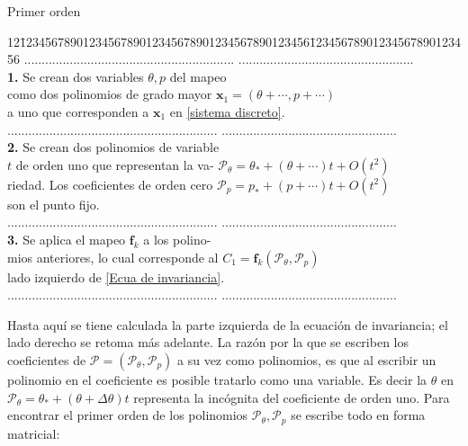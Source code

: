 \begin{center}
Primer orden
\begin{tabbing}
12\=1234567890123456789012345678901234567890123456\=12345678901234567890123456\kill%
\>............................................................  \>..................................................\\
\>\textbf{1.} Se crean dos variables $\theta,p$ del mapeo \> \\
\>como dos polinomios de grado mayor \>$\mathbf{x}_{1}=(\theta+\cdots ,p+\cdots)$  \\
\>a uno que corresponden a $\mathbf{x}_{1}$ en \eqref{sistema discreto}.  \>   \\
\>............................................................  \>..................................................\\
\>\textbf{2.} Se crean dos polinomios de variable\> \\
\>$t$ de orden uno que representan la va-   \> $\mathcal{P}_{\theta}=\theta_{*}+(\theta+\cdots)t+O(t^{2})$\\
\>riedad. Los coeficientes de orden cero \> $ \mathcal{P}_{p}=p_{*}+(p+\cdots)t+O(t^{2})$\\
\>son el punto fijo. \> \\
\>............................................................  \>..................................................\\
\>\textbf{3.} Se aplica el mapeo $\mathbf{f}_{k}$ a los polino- \> \\
\>mios  anteriores, lo cual corresponde al  \>$C_{1}=\mathbf{f}_{k}(\mathcal{P}_{\theta},\mathcal{P}_{p})$  \\
\>lado izquierdo de \eqref{Ecua de invariancia}. \> \\
\>............................................................  \>..................................................\\
\end{tabbing} 


\end{center}
Hasta aquí se tiene calculada la parte izquierda de la ecuación de invariancia; el lado derecho se retoma más adelante. La razón por la que se escriben los coeficientes de $\mathcal{P}=(\mathcal{P}_{\theta},\mathcal{P}_{p})$ a su vez como polinomios, es que al escribir un polinomio en el coeficiente es posible tratarlo como una variable. Es decir la $\theta$ en $\mathcal{P}_{\theta}=\theta_{*}+(\theta+\Delta \theta)t$ representa la incógnita del coeficiente de orden uno. Para encontrar el primer orden de los polinomios $\mathcal{P}_{\theta},\mathcal{P}_{p}$ se escribe todo en forma matricial:
